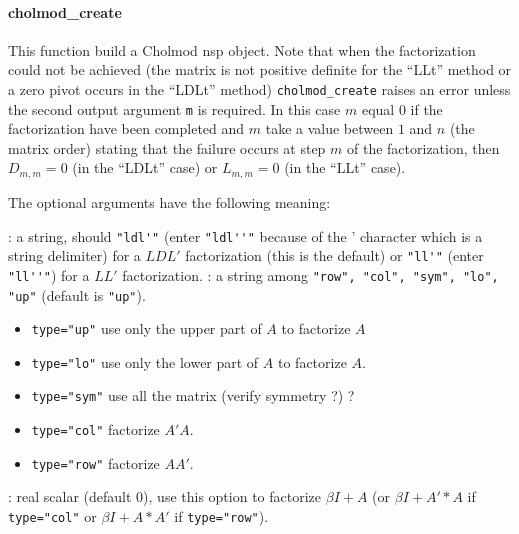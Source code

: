 \paragraph{cholmod\_create}
This function build a Cholmod nsp object. Note that when the factorization could not
be achieved (the matrix is not positive definite for the ``LLt'' method or a zero
pivot occurs in the ``LDLt'' method) \verb+cholmod_create+ raises an error unless 
the second output argument \verb+m+ is required. In this case $m$ equal $0$ if the factorization 
have been completed and $m$ take a value between $1$ and $n$ (the matrix order) stating
that the failure occurs at step $m$ of the factorization, then $D_{m,m}=0$ (in the ``LDLt''
case) or $L_{m,m}=0$  (in the ``LLt'' case).
 
The optional arguments have the following meaning:
\begin{varlist}
  : a string, should \verb+"ldl'"+ (enter \verb+"ldl''"+ because of the ' character which is
   a string delimiter) for a $LDL'$ factorization (this is the default)
                or \verb+"ll'"+ (enter  \verb+"ll''"+) for a $LL'$ factorization.
  : a string among \verb+"row", "col", "sym", "lo", "up"+ (default is \verb+"up"+).
     \begin{itemize} 
        \item \verb+type="up"+ use only the upper part of $A$ to factorize $A$
        \item  \verb+type="lo"+ use only the lower part of $A$ to factorize $A$.
        \item  \verb+type="sym"+ use all the matrix (verify symmetry ?) ?
        \item  \verb+type="col"+ factorize $A'A$.
        \item  \verb+type="row"+ factorize $AA'$.
     \end{itemize}

  : real scalar (default 0), use this option to factorize $\beta I + A$ (or $\beta I + A'*A$ if \verb+type="col"+
                or $\beta I + A*A'$ if \verb+type="row"+).


\end{varlist}
